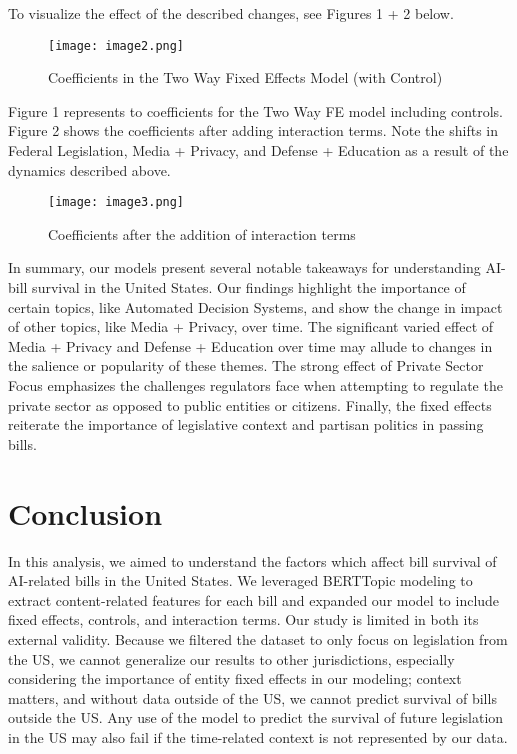 \documentclass{article}
\begin{document}
To visualize the effect of the described changes, see Figures 1 + 2 below. 

\begin{figure}[H]
    \centering
    \texttt{[image: image2.png]}
    \caption{Coefficients in the Two Way Fixed Effects Model (with Control)}
    \label{fig:enter-label}
\end{figure}

Figure 1 represents to coefficients for the Two Way FE model including controls. Figure 2 shows the coefficients after adding interaction terms. Note the shifts in Federal Legislation, Media + Privacy, and Defense + Education as a result of the dynamics described above. 


\begin{figure} [H]
    \centering
    \texttt{[image: image3.png]}
    \caption{Coefficients after the addition of interaction terms}
    \label{fig:enter-label}
\end{figure}

In summary, our models present several notable takeaways for understanding AI-bill survival in the United States. Our findings highlight the importance of certain topics, like Automated Decision Systems, and show the change in impact of other topics, like Media + Privacy, over time. The significant varied effect of Media + Privacy and Defense + Education over time may allude to changes in the salience or popularity of these themes. The strong effect of Private Sector Focus emphasizes the challenges regulators face when attempting to regulate the private sector as opposed to public entities or citizens. Finally, the fixed effects reiterate the importance of legislative context and partisan politics in passing bills.

\section{Conclusion}

In this analysis, we aimed to understand the factors which affect bill survival of AI-related bills in the United States. We leveraged BERTTopic modeling to extract content-related features for each bill and expanded our model to include fixed effects, controls, and interaction terms. Our study is limited in both its external validity. Because we filtered the dataset to only focus on legislation from the US, we cannot generalize our results to other jurisdictions, especially considering the importance of entity fixed effects in our modeling; context matters, and without data outside of the US, we cannot predict survival of bills outside the US. Any use of the model to predict the survival of future legislation in the US may also fail if the time-related context is not represented by our data. 
\end{document}
